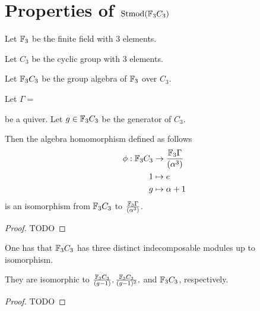 \section{Properties of \texorpdfstring{\( \operatorname{Stmod}({\mathbb{F}}_3 C_3) \)}{Stmod(F\_3C\_3)}} %


\begin{definition}
    Let \( {\mathbb{F}}_3 \) be the finite field with \( 3 \) elements.
\end{definition}

\begin{definition}
    Let \( C_3 \) be the cyclic group with \( 3 \) elements.
\end{definition}

\begin{definition}
    Let \( {\mathbb{F}}_3 C_3 \) be the group algebra of \( {\mathbb{F}}_3 \) over \( C_3 \).
\end{definition}

\begin{theorem}
    Let \( \Gamma = \)
    be a quiver.
    Let \( g \in {\mathbb{F}}_3 C_3 \) be the generator of \( C_3 \).
    
    Then the algebra homomorphism defined as follows
    \begin{align*}
        \phi: {\mathbb{F}}_3 C_3 &\to \frac{{\mathbb{F}}_3\Gamma}{(\alpha^3)} \\
        1 &\mapsto e \\
        g &\mapsto \alpha + 1
    \end{align*}
    is an isomorphism from \( {\mathbb{F}}_3 C_3 \) to \( \frac{{\mathbb{F}}_3\Gamma}{(\alpha^3)} \).    
\end{theorem}
\begin{proof}
    TODO
\end{proof}

\begin{theorem}
    One has that \( {\mathbb{F}}_3 C_3 \) has three distinct indecomposable modules up to isomorphism.
    
    They are isomorphic to \( \frac{{\mathbb{F}}_3C_3}{(g - 1)}, \frac{{\mathbb{F}}_3C_3}{(g - 1)^2}, \) and \( {\mathbb{F}}_3C_3 \), respectively.
\end{theorem}
\begin{proof}
    TODO
\end{proof}

